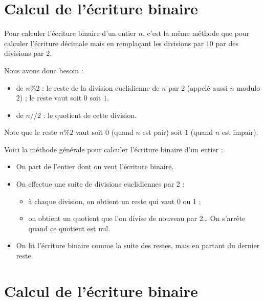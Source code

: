 \documentclass[11pt,class=report,crop=false]{standalone}
\begin{document}
\newpage

  \section*{Calcul de l'écriture binaire}

Pour calculer l'écriture binaire d'un entier $n$, c'est la même méthode que pour calculer l'écriture décimale mais en remplaçant les divisions par $10$ par des divisions par $2$.

Nous avons donc besoin :
  \begin{itemize}
    \item de $n\%2$ : le reste de la division euclidienne de $n$ par $2$ (appelé aussi $n$ modulo $2$) ; le reste vaut soit $0$ soit $1$.
    \item de $n//2$ : le quotient de cette division. 
  \end{itemize}
  
  Note que le reste  $n\%2$ vaut soit $0$ (quand $n$ est pair) soit $1$ (quand $n$ est impair).
  
  Voici la méthode générale pour calculer l'écriture binaire d'un entier :
\begin{itemize}
  \item On part de l'entier dont on veut l'écriture binaire.
  
  \item On effectue une suite de divisions euclidiennes par 2 : 
  \begin{itemize}
    \item à chaque division, on obtient un reste qui vaut 0 ou 1 ; 
    \item on obtient un quotient que l'on divise de nouveau par 2\ldots{} On s'arrête quand ce quotient est nul.
  \end{itemize}
  
  \item On lit l'écriture binaire comme la suite des restes, mais en partant du dernier reste.
\end{itemize}


\newpage
  \section*{Calcul de l'écriture binaire}
\end{document}
